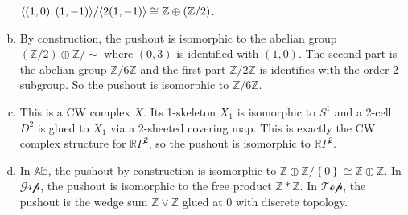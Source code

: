 \documentclass[a4paper, 12pt]{article}
\begin{document}
\begin{solution}
\begin{enumerate}[(a)]
\(\langle (1,0),(1,-1)\rangle/\langle 2(1,-1)\rangle\cong \mathbb{Z}\oplus (\mathbb{Z}/2)\).
\item By construction, the pushout is isomorphic to the abelian group \((\mathbb{Z}/2)\oplus \mathbb{Z}/\sim\) where \((0,3)\) is identified with \((1,0)\). The second part is the abelian group \(\mathbb{Z}/6 \mathbb{Z}\) and 
the first part \(\mathbb{Z}/2 \mathbb{Z}\) is identifies with the order 2 subgroup. So the pushout is isomorphic to \(\mathbb{Z}/6 \mathbb{Z}\). 
\item This is a CW complex \(X\). Its 1-skeleton \(X_1\) is isomorphic to \(S^1\) and a 2-cell \(D^2\) is glued to \(X_1\) via a 2-sheeted covering map. This is exactly the CW complex structure for \(\mathbb{R}P^2\), so the pushout is isomorphic to \(\mathbb{R}P^2\). 
\item In \(\mathbb{Ab}\), the pushout by construction is isomorphic to \(\mathbb{Z}\oplus \mathbb{Z}/\left\{ 0 \right\}\cong \mathbb{Z}\oplus \mathbb{Z}\). In \(\mathcal{Grp}\), the pushout is isomorphic to the free product \(\mathbb{Z}*\mathbb{Z}\). In \(\mathcal{Top}\), the pushout is the wedge sum 
\(\mathbb{Z}\vee \mathbb{Z}\) glued at \(0\) with discrete topology.
\end{enumerate}
\end{solution}
\end{document}
